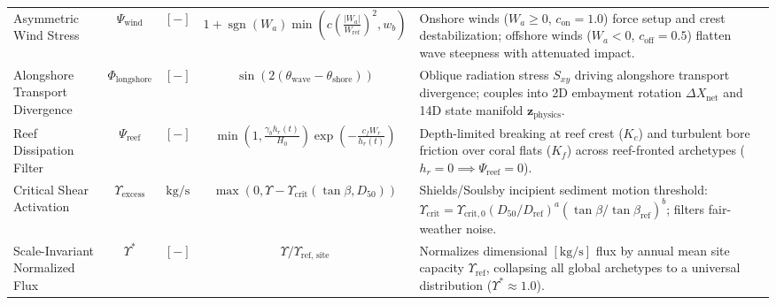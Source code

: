 \documentclass[journal]{IEEEtran}
\begin{document}
\begin{table}[t]
{\begin{tabular}{lcccp{5.5cm}p{9.0cm}}
Asymmetric Wind Stress & $\Psi_{\text{wind}}$ & $[-]$ & $1 + \operatorname{sgn}(W_a)\min\left(c\left(\frac{|W_a|}{W_{\text{ref}}}\right)^2, w_b\right)$ & Onshore winds ($W_a \ge 0$, $c_{\text{on}}=1.0$) force setup and crest destabilization; offshore winds ($W_a < 0$, $c_{\text{off}}=0.5$) flatten wave steepness with attenuated impact. \\
Alongshore Transport Divergence & $\Phi_{\text{longshore}}$ & $[-]$ & $\sin\left(2(\theta_{\text{wave}} - \theta_{\text{shore}})\right)$ & Oblique radiation stress $S_{xy}$ driving alongshore transport divergence; couples into 2D embayment rotation $\Delta X_{\text{net}}$ and 14D state manifold $\mathbf{z}_{\text{physics}}$. \\
Reef Dissipation Filter & $\Psi_{\text{reef}}$ & $[-]$ & $\min\left(1, \frac{\gamma_b h_r(t)}{H_0}\right) \exp\left(-\frac{c_f W_r}{h_r(t)}\right)$ & Depth-limited breaking at reef crest ($K_c$) and turbulent bore friction over coral flats ($K_f$) across reef-fronted archetypes ($h_r = 0 \implies \Psi_{\text{reef}} = 0$). \\
Critical Shear Activation & $\Upsilon_{\text{excess}}$ & $\text{kg}/\text{s}$ & $\max\left(0, \Upsilon - \Upsilon_{\text{crit}}(\tan\beta, D_{50})\right)$ & Shields/Soulsby incipient sediment motion threshold: $\Upsilon_{\text{crit}} = \Upsilon_{\text{crit},0} (D_{50}/D_{\text{ref}})^a (\tan\beta/\tan\beta_{\text{ref}})^b$; filters fair-weather noise. \\
Scale-Invariant Normalized Flux & $\Upsilon^*$ & $[-]$ & $\Upsilon / \Upsilon_{\text{ref, site}}$ & Normalizes dimensional $[\text{kg}/\text{s}]$ flux by annual mean site capacity $\Upsilon_{\text{ref}}$, collapsing all global archetypes to a universal distribution ($\Upsilon^* \approx 1.0$). \\
\bottomrule
\end{tabular}%
}
\end{table}
\end{document}
